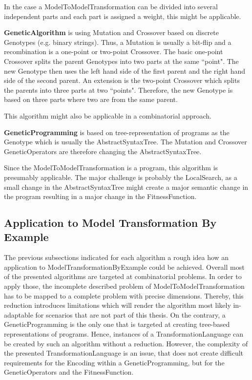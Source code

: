 In the case a \gls{ModelToModelTransformation} can be divided into several independent parts and each part is assigned a weight, this might be applicable.

\textbf{\Gls{GeneticAlgorithm}} \cite{holland75} is using \gls{Mutation} and \gls{Crossover} based on discrete \glspl{Genotype} (e.g. binary strings). Thus, a \gls{Mutation} is usually a bit-flip and a recombination is a one-point or two-point \gls{Crossover}.
The basic one-point \gls{Crossover} splits the parent \glspl{Genotype} into two parts at the same ``point". The new \gls{Genotype} then uses the left hand side of the first parent and the right hand side of the second parent. An extension is the two-point \gls{Crossover} which splits the parents into three parts at two ``points". Therefore, the new \gls{Genotype} is based on three parts where two are from the same parent.

This algorithm might also be applicable in a combinatorial approach.

\textbf{\Gls{GeneticProgramming}} \cite{koza92} is based on tree-representation of programs as the \gls{Genotype} which is usually the \gls{AbstractSyntaxTree}. The \gls{Mutation} and \gls{Crossover} \glspl{GeneticOperator} are therefore changing the \gls{AbstractSyntaxTree}.

Since the \gls{ModelToModelTransformation} is a program, this algorithm is presumably applicable. The major challenge is probably the \gls{LocalSearch}, as a small change in the \gls{AbstractSyntaxTree} might create a major semantic change in the program resulting in a major change in the \gls{FitnessFunction}.

\subsection{Application to Model Transformation By Example}\label{secApplicationToMTBE}

The previous subsections indicated for each algorithm a rough idea how an application to \gls{ModelTransformationByExample} could be achieved. Overall most of the presented algorithms are targeted at combinatorial problems. In order to apply those, the incomplete described problem of \gls{ModelToModelTransformation} has to be mapped to a complete problem with precise dimensions. Thereby, this reduction introduces limitations which will render the algorithm most likely in-adaptable for scenarios that are not part of this thesis. On the contrary, a \gls{GeneticProgramming} is the only one that is targeted at creating tree-based representations of programs. Hence, instances of a \gls{TransformationLanguage} can be created by such an algorithm without a reduction. However, the complexity of the presented \gls{TransformationLanguage} is an issue, that does not create difficult requirements for the \gls{Encoding} within a \gls{GeneticProgramming}, but for the \glspl{GeneticOperator} and the \gls{FitnessFunction}.

